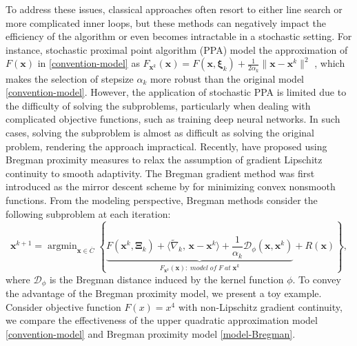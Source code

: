 \documentclass[twoside,11pt]{article}
\newcommand{\cD}{\mathcal D}
\DeclareMathOperator*{\argmin}{argmin}
\def\inprod#1#2{\langle#1,\,#2\rangle}
\def\vx{{\bm{x}}}
\begin{document}
To address these issues, classical approaches often resort to either line search or more complicated inner loops, but these methods can negatively impact the efficiency of the algorithm or even becomes intractable in a stochastic setting. For instance, stochastic proximal point algorithm (PPA) model the approximation of $F(\vx)$ in \eqref{convention-model} as $F_{{\vx^k}}(\vx)=F(\vx,{\bm\xi}_k)+\frac{1}{2\alpha_k}\|\vx-{\vx^k}\|^2$ \citep{bertsekas2011incremental,bianchi2016ergodic,patrascu2017nonasymptotic,rockafellar1976monotone}, which makes the selection of stepsize $\alpha_k$ more robust than the original model \eqref{convention-model}.
However, the application of stochastic PPA is limited due to the difficulty of solving the subproblems, particularly when dealing with  complicated objective functions, such as training deep neural networks. In such cases, solving the subproblem is almost as difficult as solving the original problem, rendering the approach impractical. 
Recently, \citet{bauschke2017descent,lu2018relatively} have proposed using Bregman proximity measures 
to relax the assumption of gradient Lipschitz continuity to smooth adaptivity. The Bregman gradient method was first introduced as the mirror descent scheme by \citet{nemirovskij1983problem} for minimizing convex nonsmooth functions.
From the modeling perspective, Bregman methods consider the following subproblem at each iteration:
\begin{equation}
{\vx^{k+1}}=\argmin_{\vx\in \overline{C}}\left\{\underbrace{F({\vx^k},{\bm\Xi}_{k})+\inprod{\widetilde\nabla_k}{\vx-{\vx^k}}+\frac{1}{\alpha_k}\cD_\phi(\vx,{\vx^k})}_{F_{{\vx^k}}(\vx):\;model\;of\;F\;at\;{\vx^k}}+R(\vx)\right\},
\label{model-Bregman}
\end{equation}
where $\cD_\phi$ is the Bregman distance induced by the kernel function $\phi$.
To convey the advantage of the Bregman proximity model, we present a toy example. Consider objective function $F(x)=x^4$ with non-Lipschitz gradient continuity, we compare the effectiveness of the upper quadratic approximation model \eqref{convention-model} and Bregman proximity model \eqref{model-Bregman}.
\end{document}
